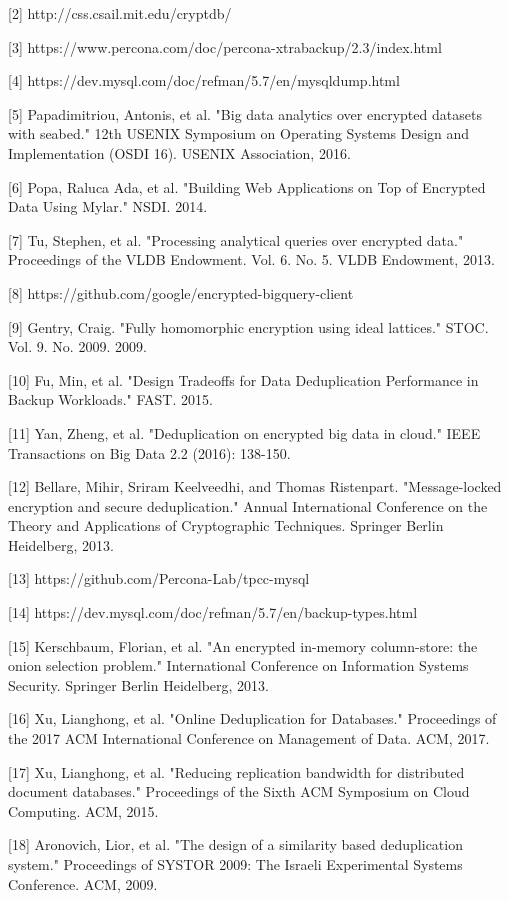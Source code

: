 [2] http://css.csail.mit.edu/cryptdb/

[3] https://www.percona.com/doc/percona-xtrabackup/2.3/index.html

[4] https://dev.mysql.com/doc/refman/5.7/en/mysqldump.html

[5] Papadimitriou, Antonis, et al. "Big data analytics over encrypted datasets with seabed." 12th USENIX Symposium on Operating Systems Design and Implementation (OSDI 16). USENIX Association, 2016.

[6] Popa, Raluca Ada, et al. "Building Web Applications on Top of Encrypted Data Using Mylar." NSDI. 2014.

[7] Tu, Stephen, et al. "Processing analytical queries over encrypted data." Proceedings of the VLDB Endowment. Vol. 6. No. 5. VLDB Endowment, 2013.

[8] https://github.com/google/encrypted-bigquery-client

[9] Gentry, Craig. "Fully homomorphic encryption using ideal lattices." STOC. Vol. 9. No. 2009. 2009.

[10] Fu, Min, et al. "Design Tradeoffs for Data Deduplication Performance in Backup Workloads." FAST. 2015.

[11] Yan, Zheng, et al. "Deduplication on encrypted big data in cloud." IEEE Transactions on Big Data 2.2 (2016): 138-150.

[12] Bellare, Mihir, Sriram Keelveedhi, and Thomas Ristenpart. "Message-locked encryption and secure deduplication." Annual International Conference on the Theory and Applications of Cryptographic Techniques. Springer Berlin Heidelberg, 2013.

[13] https://github.com/Percona-Lab/tpcc-mysql

[14] https://dev.mysql.com/doc/refman/5.7/en/backup-types.html

[15] Kerschbaum, Florian, et al. "An encrypted in-memory column-store: the onion selection problem." International Conference on Information Systems Security. Springer Berlin Heidelberg, 2013.

[16] Xu, Lianghong, et al. "Online Deduplication for Databases." Proceedings of the 2017 ACM International Conference on Management of Data. ACM, 2017.

[17] Xu, Lianghong, et al. "Reducing replication bandwidth for distributed document databases." Proceedings of the Sixth ACM Symposium on Cloud Computing. ACM, 2015.

[18] Aronovich, Lior, et al. "The design of a similarity based deduplication system." Proceedings of SYSTOR 2009: The Israeli Experimental Systems Conference. ACM, 2009.

